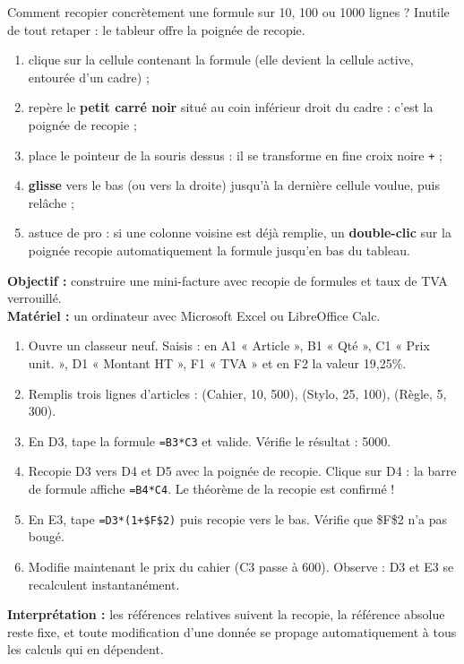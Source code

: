 \documentclass[11pt]{article}
\newcommand{\cle}[1]{{\popxbold\color{popdark}#1}}
\begin{document}
Comment recopier concrètement une formule sur 10, 100 ou 1000 lignes ? Inutile de tout retaper : le tableur offre la \cle{poignée de recopie}.

\begin{methode}
\begin{enumerate}
\item clique sur la cellule contenant la formule (elle devient la cellule active, entourée d'un cadre) ;
\item repère le \textbf{petit carré noir} situé au coin inférieur droit du cadre : c'est la poignée de recopie ;
\item place le pointeur de la souris dessus : il se transforme en fine croix noire \texttt{+} ;
\item \textbf{glisse} vers le bas (ou vers la droite) jusqu'à la dernière cellule voulue, puis relâche ;
\item astuce de pro : si une colonne voisine est déjà remplie, un \textbf{double-clic} sur la poignée recopie automatiquement la formule jusqu'en bas du tableau.
\end{enumerate}
\end{methode}

\begin{experience}
\textbf{Objectif :} construire une mini-facture avec recopie de formules et taux de TVA verrouillé.\\
\textbf{Matériel :} un ordinateur avec Microsoft Excel ou LibreOffice Calc.
\begin{enumerate}
\item Ouvre un classeur neuf. Saisis : en A1 « Article », B1 « Qté », C1 « Prix unit. », D1 « Montant HT », F1 « TVA » et en F2 la valeur 19,25\%.
\item Remplis trois lignes d'articles : (Cahier, 10, 500), (Stylo, 25, 100), (Règle, 5, 300).
\item En D3, tape la formule \texttt{=B3*C3} et valide. Vérifie le résultat : 5000.
\item Recopie D3 vers D4 et D5 avec la poignée de recopie. Clique sur D4 : la barre de formule affiche \texttt{=B4*C4}. Le théorème de la recopie est confirmé !
\item En E3, tape \texttt{=D3*(1+\$F\$2)} puis recopie vers le bas. Vérifie que \$F\$2 n'a pas bougé.
\item Modifie maintenant le prix du cahier (C3 passe à 600). Observe : D3 et E3 se recalculent instantanément.
\end{enumerate}
\textbf{Interprétation :} les références relatives suivent la recopie, la référence absolue reste fixe, et toute modification d'une donnée se propage automatiquement à tous les calculs qui en dépendent.
\end{experience}
\end{document}
